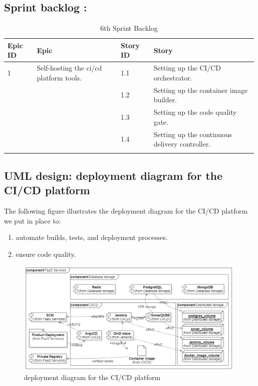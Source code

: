 \subsection{Sprint backlog :}

\begin{longtable}[H]{|m{1.5cm}|m{3cm}|m{1.5cm}|m{9cm}|}
\hline
{\textbf{Epic ID}} & {\textbf{Epic}} & {\textbf{Story ID}} & {\textbf{Story}}\\
\hline
1  & Self-hosting the ci/cd platform tools.  &  1.1	 & Setting up the CI/CD orchestrator.\\
\cline{3-4}
& & 1.2 & Setting up the container image builder. \\
\cline{3-4}
& & 1.3	& Setting up the code quality gate. \\
\cline{3-4}
& & 1.4	& Setting up the continuous delivery controller. \\
\cline{3-4}
\hline
\caption{6th Sprint Backlog}
\end{longtable}

\subsection{UML design: deployment diagram for the CI/CD platform} 

The following figure illustrates the deployment diagram for the CI/CD platform we put in place to: 
\begin{enumerate}[label = (\arabic*)]
\item automate builds, tests, and deployment processes. 
\item ensure code quality. 
\end{enumerate}

\begin{figure}[H]\centering
\includegraphics[width=1.0\textwidth,angle=00]{assets/f34.png}
\caption{deployment diagram for the CI/CD platform }
\label{fig:deployment diagram for the CI/CD platform}
\end{figure}
